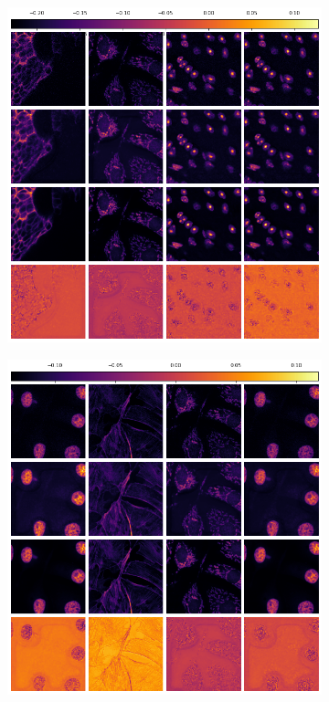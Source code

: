 \begin{figure}[H]
	\begin{subfigure}[t]{\dimexpr.5\linewidth-1.3em\relax}
		\centering
		\includegraphics[width=.95\linewidth,valign=t]{my_folder/images/denoising/fix_test_epoch_50.png}
	\end{subfigure}
	\hfill %
	\begin{subfigure}[t]{\dimexpr.5\linewidth-1.3em\relax}
		\centering
		\includegraphics[width=.95\linewidth,valign=t]{my_folder/images/denoising/fix_test2_epoch_50.png}

\end{subfigure}
\end{figure}
